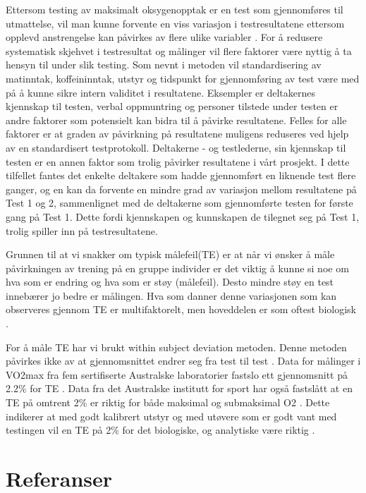 \documentclass[
]{book}
\begin{document}
Ettersom testing av maksimalt oksygenopptak er en test som gjennomføres til utmattelse, vil man kunne forvente en viss variasjon i testresultatene ettersom opplevd anstrengelse kan påvirkes av flere ulike variabler \citep{halperin2015}. For å redusere systematisk skjehvet i testresultat og målinger vil flere faktorer være nyttig å ta hensyn til under slik testing. Som nevnt i metoden vil standardisering av matinntak, koffeininntak, utstyr og tidspunkt for gjennomføring av test være med på å kunne sikre intern validitet i resultatene. Eksempler er deltakernes kjennskap til testen, verbal oppmuntring og personer tilstede under testen er andre faktorer som potensielt kan bidra til å påvirke resultatene. Felles for alle faktorer er at graden av påvirkning på resultatene muligens reduseres ved hjelp av en standardisert testprotokoll. Deltakerne - og testlederne, sin kjennskap til testen er en annen faktor som trolig påvirker resultatene i vårt prosjekt. I dette tilfellet fantes det enkelte deltakere som hadde gjennomført en liknende test flere ganger, og en kan da forvente en mindre grad av variasjon mellom resultatene på Test 1 og 2, sammenlignet med de deltakerne som gjennomførte testen for første gang på Test 1. Dette fordi kjennskapen og kunnskapen de tilegnet seg på Test 1, trolig spiller inn på testresultatene.

Grunnen til at vi snakker om typisk målefeil(TE) er at når vi ønsker å måle påvirkningen av trening på en gruppe individer er det viktig å kunne si noe om hva som er endring og hva som er støy (målefeil). Desto mindre støy en test innebærer jo bedre er målingen. Hva som danner denne variasjonen som kan observeres gjennom TE er multifaktorelt, men hoveddelen er som oftest biologisk \citep{hopkins2000}.

For å måle TE har vi brukt within subject deviation metoden. Denne metoden påvirkes ikke av at gjennomsnittet endrer seg fra test til test \citep{hopkins2000}. Data for målinger i VO2max fra fem sertifiserte Australske laboratorier fastslo ett gjennomsnitt på 2.2\% for TE \citep{halperin2015}. Data fra det Australske institutt for sport har også fastslått at en TE på omtrent 2\% er riktig for både maksimal og submaksimal O2 \citep{clark2007, robertson2010, saunders2009}. Dette indikerer at med godt kalibrert utstyr og med utøvere som er godt vant med testingen vil en TE på 2\% for det biologiske, og analytiske være riktig \citep{halperin2015}.

\hypertarget{referanser}{%
\section{Referanser}\label{referanser}}
\end{document}
